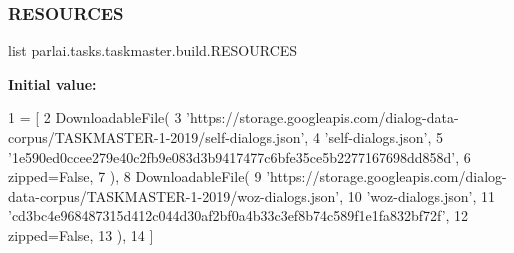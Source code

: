 \subsubsection{\texorpdfstring{R\+E\+S\+O\+U\+R\+C\+ES}{RESOURCES}}
{\footnotesize\ttfamily list parlai.\+tasks.\+taskmaster.\+build.\+R\+E\+S\+O\+U\+R\+C\+ES}

{\bfseries Initial value\+:}
\begin{DoxyCode}
1 =  [
2     DownloadableFile(
3         \textcolor{stringliteral}{'https://storage.googleapis.com/dialog-data-corpus/TASKMASTER-1-2019/self-dialogs.json'},
4         \textcolor{stringliteral}{'self-dialogs.json'},
5         \textcolor{stringliteral}{'1e590ed0ccee279e40c2fb9e083d3b9417477c6bfe35ce5b2277167698dd858d'},
6         zipped=\textcolor{keyword}{False},
7     ),
8     DownloadableFile(
9         \textcolor{stringliteral}{'https://storage.googleapis.com/dialog-data-corpus/TASKMASTER-1-2019/woz-dialogs.json'},
10         \textcolor{stringliteral}{'woz-dialogs.json'},
11         \textcolor{stringliteral}{'cd3bc4e968487315d412c044d30af2bf0a4b33c3ef8b74c589f1e1fa832bf72f'},
12         zipped=\textcolor{keyword}{False},
13     ),
14 ]
\end{DoxyCode}
